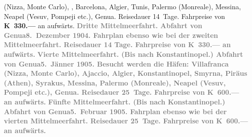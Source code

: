\begin{ledgroupsized}[t]{13cm}
{{                     (Nizza, Monte
                     Carlo), \label{T_L01495_1v}\label{T_L01495_1h}, Barcelona, Algier, Tunis, Palermo (Monreale), Messina, Neapel (Vesuv, Pompeji etc.), Genua. Reisedauer 14 Tage. Fahrpreise von \textbf{K 330.—} an aufwärts.}}\pend
           \pstart
           \textcolor{gray}{\textbf{\textbf{Dritte Mittelmeerfahrt.}
                  Abfahrt von Genua\textbf{8. Dezember 1904}. Fahrplan ebenso wie bei der zweiten Mittelmeerfahrt. Reisedauer 14 Tage. Fahrpreise von \textbf{K 330.—} an aufwärts.}}\pend
           \pstart
           \textcolor{gray}{\textbf{\textbf{Vierte Mittelmeerfahrt.}
                  (Bis nach Konstantinopel.) Abfahrt von Genua\textbf{5. Jänner 1905}. Besucht werden die Häfen: Villafranca
                     (Nizza, Monte
                     Carlo), Ajaccio, Algier, Konstantinopel, Smyrna, Piräus (Athen), Syrakus, Messina, Palermo (Monreale), Neapel (Vesuv, Pompeji etc.), Genua. Reisedauer 25 Tage. Fahrpreise von \textbf{K 600.—} an aufwärts.}}\pend
           \pstart
           \textcolor{gray}{\textbf{\textbf{Fünfte Mittelmeerfahrt.}
                  (Bis nach Konstantinopel.) Abfahrt von Genua\textbf{5. Februar 1905}. Fahrplan ebenso wie bei der vierten Mittelmeerfahrt. Reisedauer 25 Tage. Fahrpreise von \textbf{K 600.—} an aufwärts.}}\pend

\end{ledgroupsized}
